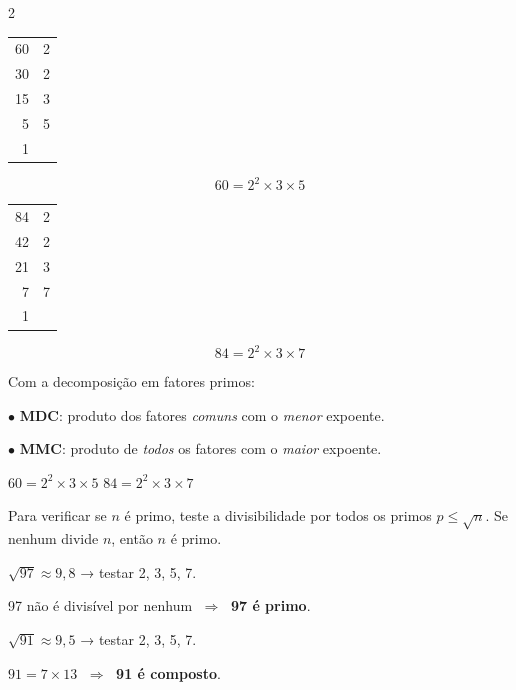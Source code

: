 \documentclass[12pt]{article}
\begin{document}
\begin{multicols}{2}
\begin{tabular}{r|l}
60 & 2 \\
30 & 2 \\
15 & 3 \\
5  & 5 \\
1  &   \\
\end{tabular}

$$60 = 2^2 \times 3 \times 5$$


\begin{tabular}{r|l}
84 & 2 \\
42 & 2 \\
21 & 3 \\
7  & 7 \\
1  &   \\
\end{tabular}

$$84 = 2^2 \times 3 \times 7$$


Com a decomposição em fatores primos:

$\bullet$ \textbf{MDC}: produto dos fatores \emph{comuns} com o \emph{menor} expoente.

$\bullet$ \textbf{MMC}: produto de \emph{todos} os fatores com o \emph{maior} expoente.


$60 = 2^2 \times 3 \times 5$ \quad $84 = 2^2 \times 3 \times 7$



Para verificar se $n$ é primo, teste a divisibilidade por todos os primos
$p \leq \sqrt{n}$. Se nenhum divide $n$, então $n$ é primo.


$\sqrt{97} \approx 9{,}8$ → testar 2, 3, 5, 7.

97 não é divisível por nenhum $\;\Rightarrow\;$ \textbf{97 é primo}. \checkmark


$\sqrt{91} \approx 9{,}5$ → testar 2, 3, 5, 7.

$91 = 7 \times 13$ $\;\Rightarrow\;$ \textbf{91 é composto}. \checkmark

\end{multicols}

\end{document}
